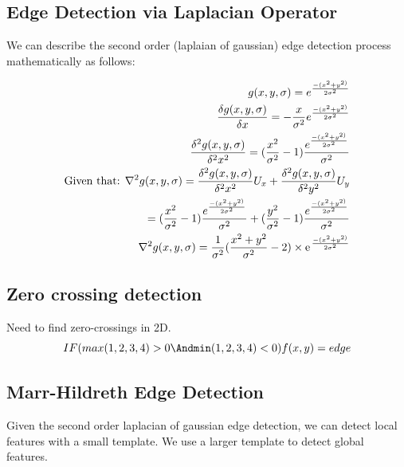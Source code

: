 \subsection{Edge Detection via Laplacian Operator}

We can describe the second order (laplaian of gaussian) edge detection process mathematically as follows:

\begin{align}
    g(x,y,\sigma) = e^{\frac{-(x^{2}+y^{2)}}{2\sigma^{2}}} \\
    \frac{\delta g(x,y,\sigma)}{\delta x} = -\frac{x}{\sigma^{2}} e^{\frac{-(x^{2}+y^{2)}}{2\sigma^{2}}} \\
    \frac{\delta^{2}g(x,y,\sigma)}{\delta^{2}x^{2}} = (\frac{x^{2}}{\sigma^{2}}-1)\frac{e^{\frac{-(x^{2}+y^{2)}}{2\sigma^{2}}}}{\sigma^{2}} \\
    \text{Given that: }\nabla^{2}g(x,y,\sigma) = \frac{\delta^{2}g(x,y,\sigma)}{\delta^{2}x^{2}}U_{x} + \frac{\delta^{2}g(x,y,\sigma)}{\delta^{2}y^{2}}U_{y} \\
    = (\frac{x^{2}}{\sigma^{2}}-1)\frac{e^{\frac{-(x^{2}+y^{2)}}{2\sigma^{2}}}}{\sigma^{2}} + (\frac{y^{2}}{\sigma^{2}}-1)\frac{e^{\frac{-(x^{2}+y^{2)}}{2\sigma^{2}}}}{\sigma^{2}} \\
    \nabla^{2}g(x,y,\sigma) = \frac{1}{\sigma^{2}}(\frac{x^{2}+y^{2}}{\sigma^{2}}-2)\times\e^{\frac{-(x^{2}+y^{2)}}{2\sigma^{2}}}
\end{align}

\subsection{Zero crossing detection}
Need to find zero-crossings in 2D.
\begin{equation}
    IF(max(1,2,3,4)>0\Andmin(1,2,3,4)<0) {f(x,y) = edge}
\end{equation}

\subsection{Marr-Hildreth Edge Detection}

Given the second order laplacian of gaussian edge detection, we can detect local features with a small template. We use a larger template to detect global features.